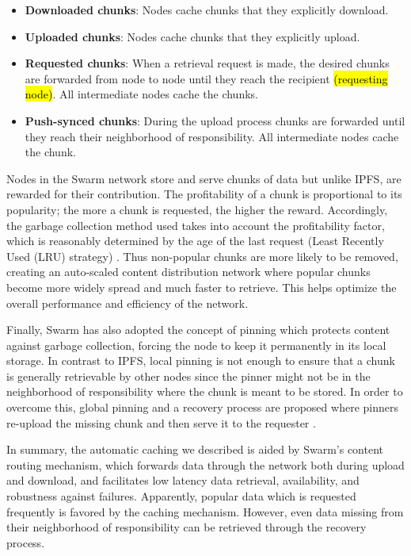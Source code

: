 \begin{itemize}
    \item \textbf{Downloaded chunks}: Nodes cache chunks that they explicitly download.
    \item \textbf{Uploaded chunks}: Nodes cache chunks that they explicitly upload.
    \item \textbf{Requested chunks}: When a retrieval request is made, the desired chunks are forwarded from node to node until they reach the recipient \hl{(requesting node)}. All intermediate nodes cache the chunks.
    \item \textbf{Push-synced chunks}: During the upload process chunks are forwarded until they reach their neighborhood of responsibility. All intermediate nodes cache the chunk.
\end{itemize} 

Nodes in the Swarm network store and serve chunks of data but unlike IPFS, are rewarded for their contribution.  The profitability of a chunk is proportional to its popularity; the more  a chunk is requested, the higher the reward. Accordingly, the garbage collection method used takes into account the profitability factor, which is reasonably determined by the age of the last request (Least Recently Used (LRU) strategy) \citep[p.~72]{tron_2020}. Thus non-popular chunks are more likely to be removed, creating an auto-scaled content distribution network \citep[p.~72]{tron_2020} where popular chunks become more widely spread and much faster to retrieve. This helps optimize the overall performance and efficiency of the network.

Finally, Swarm has also adopted the concept of pinning which protects content against garbage collection, forcing the node to keep it permanently in its local storage. In contrast to IPFS, local pinning is not enough to ensure that a chunk is generally retrievable by other nodes since the pinner might not be in the neighborhood of responsibility where the chunk is meant to be stored. In order to overcome this, global pinning and a recovery process are proposed where pinners re-upload the missing chunk and then serve it to the requester \citep[pp.~161--167]{tron_2020}.

In summary, the automatic caching we described is aided by Swarm's content routing mechanism, which forwards data through the network both during upload and download, and facilitates low latency data retrieval, availability, and robustness against failures. Apparently, popular data which is requested frequently is favored by the caching mechanism. However, even data missing from their neighborhood of responsibility can be retrieved through the recovery process.

